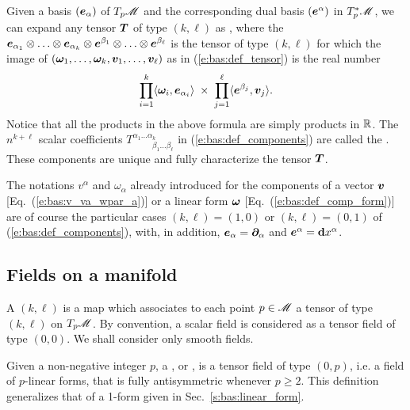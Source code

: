 Given a basis $(\bm{e}_\alpha)$ of $T_p\mathscr{M}$
and the corresponding dual basis $(\bm{e}^\alpha)$ in ${T_p^*\mathscr{M}}$, we
can expand any tensor $\bm{T}$ of type $(k,\ell)$ as
\be \label{e:bas:def_components}
     ,
\ee
where the  $ \bm{e}_{\alpha_1} \otimes \ldots \otimes \bm{e}_{\alpha_k} \otimes
\bm{e}^{\beta_1} \otimes \ldots \otimes \bm{e}^{\beta_\ell}$ is the tensor of
type $(k,\ell)$ for which the image of  $(\bm{\omega}_1,\ldots,\bm{\omega}_k,\bm{v}_1,\ldots,\bm{v}_\ell)$ as in
(\ref{e:bas:def_tensor}) is the real number
\[
    \prod_{i=1}^k \langle \bm{\omega}_i,\bm{e}_{\alpha_i}\rangle \;\times\;
    \prod_{j=1}^\ell \langle \bm{e}^{\beta_j},\bm{v}_j\rangle .
\]
Notice that all the products in the above formula are simply products in $\mathbb{R}$.
The $n^{k+\ell}$ scalar coefficients  $T^{\alpha_1\ldots\alpha_k}_{\qquad\ \; \beta_1\ldots\beta_\ell}$ in (\ref{e:bas:def_components}) are called the .
These components are unique and fully characterize
the tensor $\bm{T}$.

\begin{remark}
The notations $v^\alpha$ and $\omega_\alpha$ already introduced for the components
of a vector $\bm{v}$ [Eq.~(\ref{e:bas:v_va_wpar_a})]
or a linear form $\bm{\omega}$ [Eq.~(\ref{e:bas:def_comp_form})] are of course the
particular cases $(k,\ell)=(1,0)$ or $(k,\ell)=(0,1)$ of (\ref{e:bas:def_components}), with,
in addition, $\bm{e}_\alpha=\bm{\partial}_\alpha$ and $\bm{e}^\alpha = \mathbf{d} x^\alpha$.
\end{remark}


\subsection{Fields on a manifold} \label{s:bas:fields}

A  $(k,\ell)$ is a map
which associates to each point $p\in\mathscr{M}$ a tensor of type $(k,\ell)$ on $T_p\mathscr{M}$.
By convention, a scalar field is considered as a tensor field of type $(0,0)$.
We shall consider only smooth fields.

Given a non-negative integer $p$, a
,
or
, is a tensor field of type $(0,p)$, i.e.
a field of $p$-linear forms, that is fully antisymmetric whenever $p\geq 2$.
This definition generalizes that of a 1-form given in Sec.~\ref{s:bas:linear_form}.

